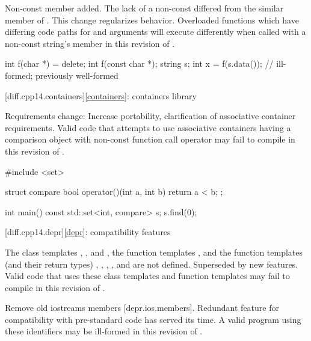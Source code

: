 \change
Non-const  member added.
\rationale
The lack of a non-const 
differed from the similar member of .
This change regularizes behavior.
\effect
Overloaded functions which have differing code paths
for  and  arguments
will execute differently
when called with a non-const string's  member
in this revision of \Cpp{}.
\begin{example}
\begin{codeblock}
int f(char *) = delete;
int f(const char *);
string s;
int x = f(s.data());            // ill-formed; previously well-formed
\end{codeblock}
\end{example}

[diff.cpp14.containers]{\ref{containers}: containers library}

\change
Requirements change:
\rationale
Increase portability, clarification of associative container requirements.
\effect
Valid \CppXIV{} code that attempts to use associative containers
having a comparison object with non-const function call operator
may fail to compile in this revision of \Cpp{}.
\begin{example}
\begin{codeblock}
#include <set>

struct compare
{
  bool operator()(int a, int b)
  {
    return a < b;
  }
};

int main() {
  const std::set<int, compare> s;
  s.find(0);
}
\end{codeblock}
\end{example}

[diff.cpp14.depr]{\ref{depr}: compatibility features}

\nodiffref
\change
The class templates
,
, and
,
the function templates
,
and the function templates (and their return types)
,
,
,
, and
are not defined.
\rationale
Superseded by new features.
\effect
Valid \CppXIV{} code that uses these class templates
and function templates may fail to compile in this revision of \Cpp{}.

\nodiffref
\change
Remove old iostreams members [depr.ios.members].
\rationale
Redundant feature for compatibility with pre-standard code
has served its time.
\effect
A valid \CppXIV{} program using these identifiers
may be ill-formed in this revision of \Cpp{}.

